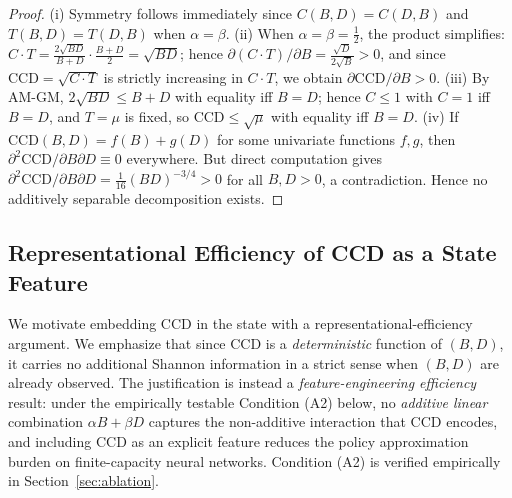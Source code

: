 \documentclass[11pt,a4paper]{article}
\theoremstyle{plain}
\theoremstyle{definition}
\newcommand{\CCD}{\mathrm{CCD}}
\begin{document}
\begin{proof}
(i) Symmetry follows immediately since $C(B,D)=C(D,B)$ and $T(B,D)=T(D,B)$ when
$\alpha=\beta$.  (ii) When $\alpha=\beta=\tfrac{1}{2}$, the product simplifies:
$C\cdot T = \tfrac{2\sqrt{BD}}{B+D}\cdot\tfrac{B+D}{2}=\sqrt{BD}$; hence
$\partial(C\cdot T)/\partial B = \tfrac{\sqrt{D}}{2\sqrt{B}}>0$, and since $\CCD=\sqrt{C\cdot T}$
is strictly increasing in $C\cdot T$, we obtain $\partial\CCD/\partial B>0$.  (iii) By AM-GM, $2\sqrt{BD}\le B+D$ with equality iff
$B=D$; hence $C\le1$ with $C=1$ iff $B=D$, and $T=\mu$ is fixed, so $\CCD\le\sqrt{\mu}$
with equality iff $B=D$.  (iv) If $\CCD(B,D)=f(B)+g(D)$ for some univariate functions $f,g$, then
$\partial^2\CCD/\partial B\partial D\equiv0$ everywhere.  But direct computation gives
$\partial^2\CCD/\partial B\partial D = \tfrac{1}{16}(BD)^{-3/4}>0$ for all $B,D>0$,
a contradiction.  Hence no additively separable decomposition exists.
\end{proof}

\subsection{Representational Efficiency of CCD as a State Feature}
\label{sec:infotheory}

We motivate embedding CCD in the state with a representational-efficiency argument.
We emphasize that since CCD is a \emph{deterministic} function of $(B,D)$, it carries no
additional Shannon information in a strict sense when $(B,D)$ are already observed.
The justification is instead a \emph{feature-engineering efficiency} result: under the
empirically testable Condition (A2) below, no \emph{additive linear} combination
$\alpha B+\beta D$ captures the non-additive interaction that CCD encodes, and including
CCD as an explicit feature reduces the policy approximation burden on finite-capacity
neural networks.  Condition (A2) is verified empirically in Section~\ref{sec:ablation}.
\end{document}
